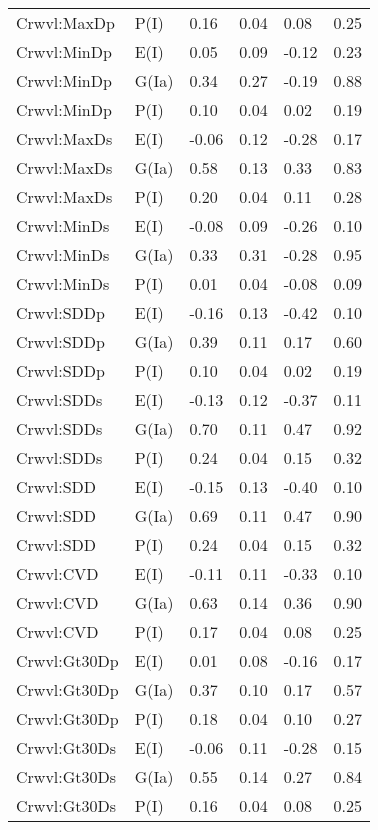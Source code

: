 \begin{center}
\begin{longtable}{|p{1.1in}|p{0.7in}|p{0.7in}|p{0.6in}|p{0.6in}|p{0.6in}|}
  Crwvl:MaxDp & P(I) & 0.16 & 0.04 & 0.08 & 0.25 \\ 
  Crwvl:MinDp & E(I) & 0.05 & 0.09 & -0.12 & 0.23 \\ 
  Crwvl:MinDp & G(Ia) & 0.34 & 0.27 & -0.19 & 0.88 \\ 
  Crwvl:MinDp & P(I) & 0.10 & 0.04 & 0.02 & 0.19 \\ 
  Crwvl:MaxDs & E(I) & -0.06 & 0.12 & -0.28 & 0.17 \\ 
  Crwvl:MaxDs & G(Ia) & 0.58 & 0.13 & 0.33 & 0.83 \\ 
  Crwvl:MaxDs & P(I) & 0.20 & 0.04 & 0.11 & 0.28 \\ 
  Crwvl:MinDs & E(I) & -0.08 & 0.09 & -0.26 & 0.10 \\ 
  Crwvl:MinDs & G(Ia) & 0.33 & 0.31 & -0.28 & 0.95 \\ 
  Crwvl:MinDs & P(I) & 0.01 & 0.04 & -0.08 & 0.09 \\ 
  Crwvl:SDDp & E(I) & -0.16 & 0.13 & -0.42 & 0.10 \\ 
  Crwvl:SDDp & G(Ia) & 0.39 & 0.11 & 0.17 & 0.60 \\ 
  Crwvl:SDDp & P(I) & 0.10 & 0.04 & 0.02 & 0.19 \\ 
  Crwvl:SDDs & E(I) & -0.13 & 0.12 & -0.37 & 0.11 \\ 
  Crwvl:SDDs & G(Ia) & 0.70 & 0.11 & 0.47 & 0.92 \\ 
  Crwvl:SDDs & P(I) & 0.24 & 0.04 & 0.15 & 0.32 \\ 
  Crwvl:SDD & E(I) & -0.15 & 0.13 & -0.40 & 0.10 \\ 
  Crwvl:SDD & G(Ia) & 0.69 & 0.11 & 0.47 & 0.90 \\ 
  Crwvl:SDD & P(I) & 0.24 & 0.04 & 0.15 & 0.32 \\ 
  Crwvl:CVD & E(I) & -0.11 & 0.11 & -0.33 & 0.10 \\ 
  Crwvl:CVD & G(Ia) & 0.63 & 0.14 & 0.36 & 0.90 \\ 
  Crwvl:CVD & P(I) & 0.17 & 0.04 & 0.08 & 0.25 \\ 
  Crwvl:Gt30Dp & E(I) & 0.01 & 0.08 & -0.16 & 0.17 \\ 
  Crwvl:Gt30Dp & G(Ia) & 0.37 & 0.10 & 0.17 & 0.57 \\ 
  Crwvl:Gt30Dp & P(I) & 0.18 & 0.04 & 0.10 & 0.27 \\ 
  Crwvl:Gt30Ds & E(I) & -0.06 & 0.11 & -0.28 & 0.15 \\ 
  Crwvl:Gt30Ds & G(Ia) & 0.55 & 0.14 & 0.27 & 0.84 \\ 
  Crwvl:Gt30Ds & P(I) & 0.16 & 0.04 & 0.08 & 0.25 \\ 

\end{longtable}
\end{center}
